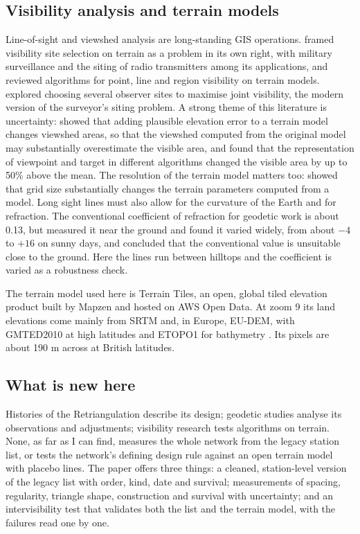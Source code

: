 \documentclass[11pt,a4paper]{article}
\begin{document}
\subsection{Visibility analysis and terrain models}
Line-of-sight and viewshed analysis are long-standing GIS operations. \citet{lee1991} framed visibility site selection on terrain as a problem in its own right, with military surveillance and the siting of radio transmitters among its applications, and \citet{defloriani1994} reviewed algorithms for point, line and region visibility on terrain models. \citet{kim2004} explored choosing several observer sites to maximise joint visibility, the modern version of the surveyor's siting problem. A strong theme of this literature is uncertainty: \citet{fisher1991} showed that adding plausible elevation error to a terrain model changes viewshed areas, so that the viewshed computed from the original model may substantially overestimate the visible area, and \citet{fisher1993} found that the representation of viewpoint and target in different algorithms changed the visible area by up to 50\% above the mean. The resolution of the terrain model matters too: \citet{zhang1994} showed that grid size substantially changes the terrain parameters computed from a model. Long sight lines must also allow for the curvature of the Earth and for refraction. The conventional coefficient of refraction for geodetic work is about 0.13, but \citet{hirt2010} measured it near the ground and found it varied widely, from about $-4$ to $+16$ on sunny days, and concluded that the conventional value is unsuitable close to the ground. Here the lines run between hilltops and the coefficient is varied as a robustness check.

The terrain model used here is Terrain Tiles, an open, global tiled elevation product built by Mapzen and hosted on AWS Open Data. At zoom 9 its land elevations come mainly from SRTM \citep{farr2007} and, in Europe, EU-DEM, with GMTED2010 \citep{danielson2011} at high latitudes and ETOPO1 \citep{amante2009} for bathymetry \citep{tilezen}. Its pixels are about 190 m across at British latitudes.

\subsection{What is new here}
Histories of the Retriangulation describe its design; geodetic studies analyse its observations and adjustments; visibility research tests algorithms on terrain. None, as far as I can find, measures the whole network from the legacy station list, or tests the network's defining design rule against an open terrain model with placebo lines. The paper offers three things: a cleaned, station-level version of the legacy list with order, kind, date and survival; measurements of spacing, regularity, triangle shape, construction and survival with uncertainty; and an intervisibility test that validates both the list and the terrain model, with the failures read one by one.
\end{document}
